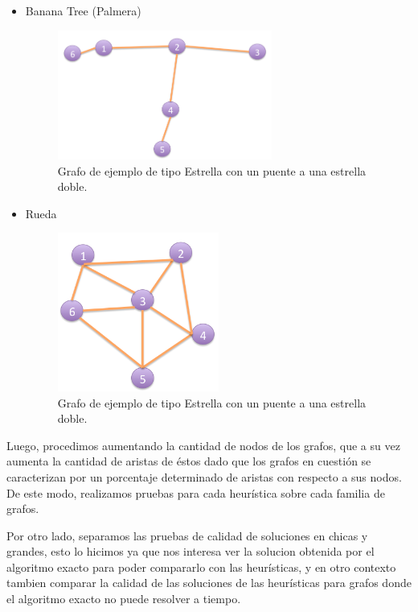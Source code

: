 \begin{itemize}
\item Banana Tree (Palmera)
 \begin{figure}[H] %
\begin{center}
\includegraphics[width=200pt]{../imgs/banana.jpg}
\caption{Grafo de ejemplo de tipo Estrella con un puente a una estrella doble.}
\end{center}
\end{figure}
\item Rueda
 \begin{figure}[H] %
\begin{center}
\includegraphics[width=150pt]{../imgs/rueda.jpg}
\caption{Grafo de ejemplo de tipo Estrella con un puente a una estrella doble.}
\end{center}
\end{figure}


\end{itemize}
Luego, procedimos aumentando la cantidad de nodos de los grafos, que a su vez aumenta la cantidad de aristas de éstos dado que los grafos en cuestión se caracterizan por un porcentaje determinado de aristas con respecto a sus nodos. De este modo, realizamos pruebas para cada heurística sobre cada familia de grafos.

Por otro lado, separamos las pruebas de calidad de soluciones en chicas y grandes, esto lo hicimos ya que nos interesa ver la solucion obtenida por el algoritmo exacto para poder compararlo con las heurísticas, y en otro contexto tambien comparar la calidad de las soluciones de las heurísticas para grafos donde el algoritmo exacto no puede resolver a tiempo. 

